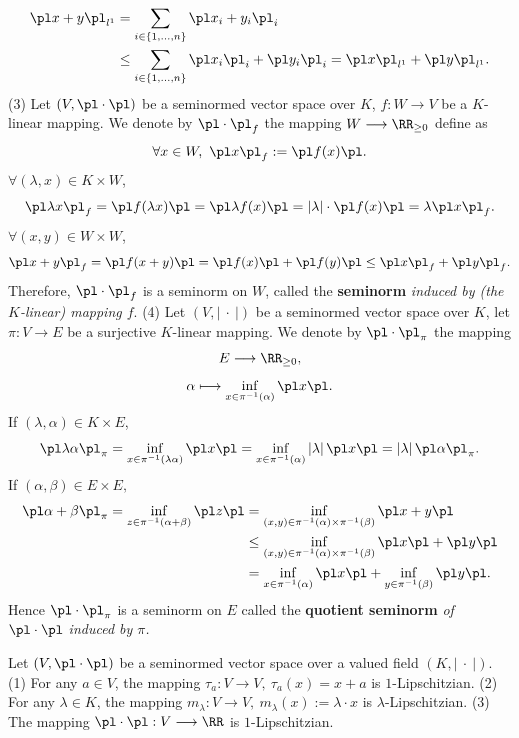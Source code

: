 \begin{exampleenv}
\begin{align*}
        \pl x+y\pl_{l^1}&=\sum_{i\in\{1,\ldots,n\}}\pl x_i+y_i\pl_i\\
        &\le \sum_{i\in\{1,\dots,n\}}\pl x_i\pl_i+\pl y_i\pl_i= \pl x\pl_{l^1}+\pl y\pl_{l^1}.
    \end{align*}
    (3) Let $(V,\pl\cdot\pl)$ be a seminormed vector space over $K$, $f:W\longrightarrow V$ be a $K$-linear mapping. We denote by $\pl\cdot\pl_f$ the mapping $W\longrightarrow \RR_{\ge 0}$ define as 
    $$\forall x\in W, \ \pl x\pl_f:=\pl f(x)\pl.$$
    $\forall (\lambda,x)\in K\times W$, 
    $$\pl \lambda x\pl_f=\pl f(\lambda x)\pl =\pl \lambda f(x)\pl =\left|\lambda\right|\cdot\pl f(x)\pl=\lambda \pl x\pl_f.$$
    $\forall (x,y)\in W\times W$, 
    $$\pl x+y\pl_f=\pl f(x+y)\pl=\pl f(x)\pl+\pl f(y)\pl\le \pl x\pl_f+\pl y\pl_f.$$
    Therefore, $\pl\cdot\pl_f$ is a seminorm on $W$, called the \textbf{seminorm} \textit{induced by (the $K$-linear) mapping $f$}.
    \newline
    (4) Let $(V,\left|\ \cdot\ \right|)$ be a seminormed vector space over $K$, let $\pi:V\longrightarrow E$ be a surjective $K$-linear mapping. We denote by $\pl\cdot\pl_\pi$ the mapping
    $$E\longrightarrow \RR_{\ge 0},$$
    $$\alpha\longmapsto \inf_{x\in \pi^{-1}(\alpha)}\pl x\pl.$$
    If $(\lambda,\alpha)\in K\times E$,
    $$\pl \lambda\alpha\pl_\pi=\inf_{x\in \pi^{-1}(\lambda\alpha)}\pl x \pl=\inf_{x\in \pi^{-1}(\alpha)}\left|\lambda\right|\pl x\pl=\left|\lambda\right|\pl\alpha\pl_\pi.$$
    If $(\alpha,\beta)\in E\times E,$
    \begin{align*}
         \pl\alpha+\beta\pl_\pi=\inf_{z\in\pi^{-1}(\alpha+\beta)}\pl z\pl &=\inf_{(x,y)\in \pi^{-1}(\alpha)\times\pi^{-1}(\beta)}\pl x+y\pl \\
         &\le\inf_{(x,y)\in \pi^{-1}(\alpha)\times\pi^{-1}(\beta)}\pl x\pl +\pl y\pl\\
         &=\inf_{x\in \pi^{-1}(\alpha)}\pl x\pl+\inf_{y\in \pi^{-1}(\beta)}\pl y\pl.
    \end{align*}
    Hence $\pl\cdot\pl_\pi$ is a seminorm on $E$ called the \textbf{quotient seminorm} \textit{of $\pl\cdot\pl$ induced by $\pi$.} 
\end{exampleenv}
\begin{propositionenv}
    Let $(V,\pl\cdot\pl)$ be a seminormed vector space over a valued field $(K,\left|\ \cdot\ \right|)$.
    \newline
    (1) For any $a\in V$, the mapping $\tau_a:V\longrightarrow V,\ \tau_a(x)=x+a$ is $1$-Lipschitzian.
    \newline
    (2) For any $\lambda\in K$, the mapping $m_\lambda:V\longrightarrow V,\ m_\lambda(x):=\lambda\cdot x$ is $\lambda$-Lipschitzian.
    \newline
    (3) The mapping $\pl\cdot\pl: V\longrightarrow \RR$ is $1$-Lipschitzian.
\end{propositionenv}
